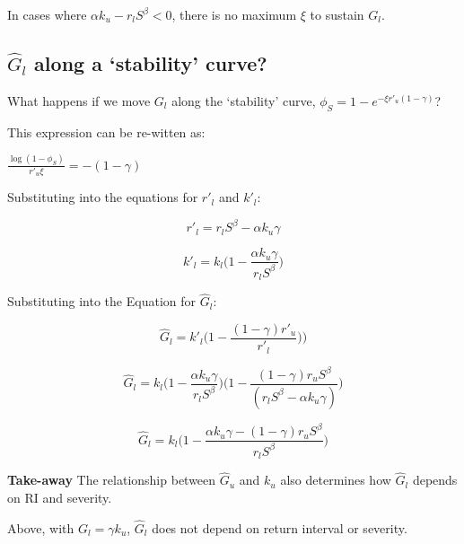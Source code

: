 \documentclass{article}
\begin{document}
In cases where ${\alpha k_u - r_l S^\beta} < 0$, there is no maximum $\xi$ to sustain $G_l$.



  \subsection{$\hat G_l$ along a `stability' curve?}

What happens if we move  $G_l$ along the `stability' curve, $\phi_S = 1- e^{-\xi r'_u (1-\gamma)}$?

This expression can be re-witten as:

 $\frac{\log(1 - \phi_S)}{  r'_u \xi  }= -  (1 - \gamma )$


 Substituting into the equations for $r'_l$ and $k'_l$:

\begin{equation}
r'_l= r_l S^\beta   - \alpha k_u \gamma
\end{equation}


\begin{equation}
 k'_l  = k_l  \bigg(1  - \frac{\alpha k_u \gamma} { r_l S^\beta}\bigg)
\end{equation}


Substituting into the Equation for $\hat G_l$:

\begin{equation}
\hat{G}_l =
 		k'_l \big( 1 - \frac{(1 - \gamma) r'_u }{r'_l }  ) \big)
\end{equation}



\begin{equation}
\hat{G}_l =
 		  k_l  \bigg(1  - \frac{\alpha k_u \gamma} { r_l S^\beta}\bigg)
		  \bigg( 1 - \frac{(1 - \gamma) r_u  S^\beta }{(r_l S^\beta   - \alpha k_u \gamma)}   \bigg)
\end{equation}


\begin{equation}
\hat{G}_l =
 		  {k_l}
		  \bigg( 1 - \frac{\alpha k_u \gamma - (1 - \gamma) r_u  S^\beta}{r_l S^\beta }  \bigg)
\end{equation}


\textbf{Take-away}
 The relationship between $\hat G_u$ and $k_u$ also determines how $\hat G_l$ depends on RI and severity.

Above, with $G_l= \gamma k_u$,  $\hat{G}_l$ does not depend on return interval or severity.
\end{document}
